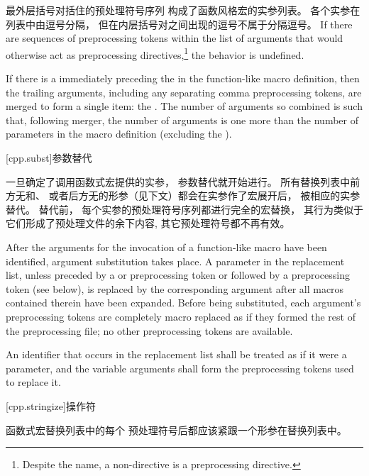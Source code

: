 \pnum
{}%
最外层括号对括住的预处理符号序列
构成了函数风格宏的实参列表。
各个实参在列表中由逗号分隔，
但在内层括号对之间出现的逗号不属于分隔逗号。
If there are sequences of preprocessing tokens within the list of
arguments that would otherwise act as preprocessing directives,\footnote{Despite the name, a non-directive is a preprocessing directive.}
the behavior is undefined.

\pnum
{}%
If there is a  immediately preceding the \tcode{)} in the
function-like macro
definition, then the trailing arguments, including any separating comma preprocessing
tokens, are merged to form a single item: the . The number of
arguments so combined is such that, following merger, the number of arguments is
one more than the number of parameters in the macro definition (excluding the
).

[cpp.subst]{参数替代}%
%
%

\pnum
一旦确定了调用函数式宏提供的实参，
参数替代就开始进行。
所有替换列表中前方无\tcode{\#}和\tcode{\#\#}、
或者后方无\tcode{\#\#}的形参（见下文）都会在实参作了宏展开后，
被相应的实参替代。
替代前，
每个实参的预处理符号序列都进行完全的宏替换，
其行为类似于它们形成了预处理文件的余下内容,
其它预处理符号都不再有效。

\pnum
After the arguments for the invocation of a function-like macro have
been identified, argument substitution takes place.
A parameter in the replacement list, unless preceded by a
\tcode{\#}
or
\tcode{\#\#}
preprocessing token or followed by a
\tcode{\#\#}
preprocessing token (see below),
is replaced by the corresponding argument after all macros
contained therein have been expanded.
Before being substituted,
each argument's preprocessing tokens are completely
macro replaced as if they formed the rest of the
preprocessing file;
no other preprocessing tokens are available.

\pnum
An identifier  that occurs in the replacement list
shall be treated as if it were a parameter, and the variable arguments shall form
the preprocessing tokens used to replace it.

[cpp.stringize]{\tcode{\#}操作符}%
%

\pnum
函数式宏替换列表中的每个
\tcode{\#}
预处理符号后都应该紧跟一个形参在替换列表中。


